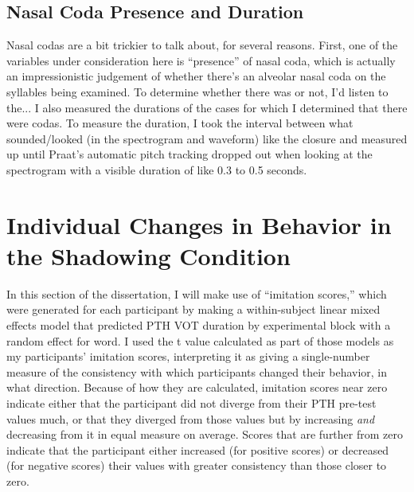         \subsection{Nasal Coda Presence and Duration}
        Nasal codas are a bit trickier to talk about, for several reasons. First, one of the variables under consideration here is ``presence'' of nasal coda, which is actually an impressionistic judgement of whether there's an alveolar nasal coda on the syllables being examined. To determine whether there was or not, I'd listen to the...%
        I also measured the durations of the cases for which I determined that there were codas. To measure the duration, I took the interval between what sounded/looked (in the spectrogram and waveform) like the closure and measured up until Praat's automatic pitch tracking dropped out when looking at the spectrogram with a visible duration of like 0.3 to 0.5 seconds. %

    \section{Individual Changes in Behavior in the Shadowing Condition} %
    \label{sec:whyDoTheyShadow}
    In this section of the dissertation, I will make use of ``imitation scores,'' which were generated for each participant by making a within-subject linear mixed effects model that predicted PTH VOT duration by experimental block with a random effect for word. I used the t value calculated as part of those models as my participants' imitation scores, interpreting it as giving a single-number measure of the consistency with which participants changed their behavior, in what direction. Because of how they are calculated, imitation scores near zero indicate either that the participant did not diverge from their PTH pre-test values much, or that they diverged from those values but by increasing \textit{and} decreasing from it in equal measure on average. Scores that are further from zero indicate that the participant either increased (for positive scores) or decreased (for negative scores) their values with greater consistency than those closer to zero.

